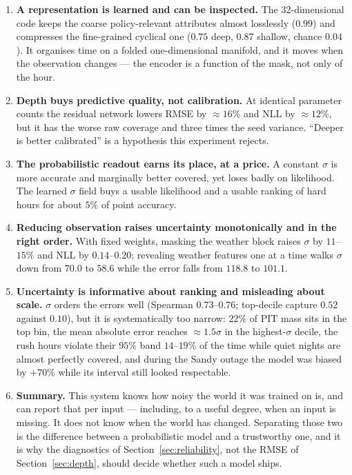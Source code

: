 \documentclass[11pt,a4paper]{article}
\begin{document}
\begin{enumerate}
\item \textbf{A representation is learned and can be inspected.} The 32-dimensional code keeps the
coarse policy-relevant attributes almost losslessly ($0.99$) and compresses the fine-grained cyclical
one ($0.75$ deep, $0.87$ shallow, chance $0.04$). It organises time on a folded one-dimensional
manifold, and it moves when the observation changes --- the encoder is a function of the mask, not only
of the hour.

\item \textbf{Depth buys predictive quality, not calibration.} At identical parameter counts the
residual network lowers RMSE by $\approx16\%$ and NLL by $\approx12\%$, but it has the worse raw
coverage and three times the seed variance. ``Deeper is better calibrated'' is a hypothesis this
experiment rejects.

\item \textbf{The probabilistic readout earns its place, at a price.} A constant $\sigma$ is more
accurate and marginally better covered, yet loses badly on likelihood. The learned $\sigma$ field buys
a usable likelihood and a usable ranking of hard hours for about $5\%$ of point accuracy.

\item \textbf{Reducing observation raises uncertainty monotonically and in the right order.} With fixed
weights, masking the weather block raises $\sigma$ by $11$--$15\%$ and NLL by $0.14$--$0.20$; revealing
weather features one at a time walks $\sigma$ down from $70.0$ to $58.6$ while the error falls from
$118.8$ to $101.1$.

\item \textbf{Uncertainty is informative about ranking and misleading about scale.} $\sigma$ orders the
errors well (Spearman $0.73$--$0.76$; top-decile capture $0.52$ against $0.10$), but it is
systematically too narrow: $22\%$ of PIT mass sits in the top bin, the mean absolute error reaches
$\approx1.5\sigma$ in the highest-$\sigma$ decile, the rush hours violate their $95\%$ band
$14$--$19\%$ of the time while quiet nights are almost perfectly covered, and during the Sandy outage
the model was biased by $+70\%$ while its interval still looked respectable.

\item \textbf{Summary.} This system knows how noisy the world it was trained on is, and can report that
per input --- including, to a useful degree, when an input is missing. It does not know when the world
has changed. Separating those two is the difference between a probabilistic model and a trustworthy
one, and it is why the diagnostics of Section~\ref{sec:reliability}, not the RMSE of
Section~\ref{sec:depth}, should decide whether such a model ships.
\end{enumerate}
\end{document}

